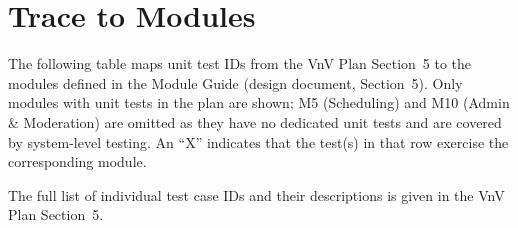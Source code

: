 \section{Trace to Modules}

The following table maps unit test IDs from the VnV Plan Section~5 to the modules defined in the Module Guide (design document, Section~5). Only modules with unit tests in the plan are shown; M5 (Scheduling) and M10 (Admin \& Moderation) are omitted as they have no dedicated unit tests and are covered by system-level testing. An ``X'' indicates that the test(s) in that row exercise the corresponding module.

\begin{table}[H]
\centering
{}
\caption{Unit test to module traceability. Columns correspond to the module identifiers defined in Section~2.}
\label{tab:trace-modules}
\end{table}

The full list of individual test case IDs and their descriptions is given in the VnV Plan Section~5.
